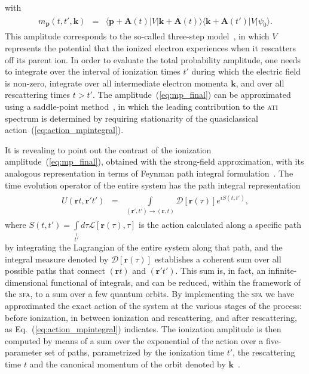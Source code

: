 %
with
%
\begin{eqnarray}
  \label{eq:mp_braketfunction}
  \begin{split}
    m_{\mathbf{p}}(t, t', \mathbf{k}) & = &
    \langle \mathbf{p} + \mathbf{A}(t) | V |
    \mathbf{k} + \mathbf{A}(t) \rangle 
    \langle \mathbf{k} + \mathbf{A}(t') | V |
    \psi_{0} \rangle.
  \end{split}
\end{eqnarray}
%
This amplitude corresponds to the so-called three-step
model~\cite{Becker_ati2002}, in which $V$ represents the potential
that the ionized electron experiences when it rescatters off its
parent ion. In order to evaluate the total probability amplitude, one
needs to integrate over the interval of ionization times $t'$ during
which the electric field is non-zero, integrate over all intermediate
electron momenta $\mathbf{k}$, and over all rescattering times $t >
t'$. The amplitude~(\ref{eq:mp_final}) can be approximated using a
saddle-point method~\cite{Lewenstein_1995}, in which the leading
contribution to the \textsc{ati} spectrum is determined by requiring
stationarity of the quasiclassical
action~(\ref{eq:action_mpintegral}).


It is revealing to point out the contrast of the ionization
amplitude~(\ref{eq:mp_final}), obtained with the strong-field
approximation, with its analogous representation in terms of Feynman
path integral formulation~\cite{RevModPhysFeynman}. The time evolution
operator of the entire system has the path integral representation
\begin{eqnarray}
\label{eq:te_path}
\begin{split}
U(\mathbf{r}t, \mathbf{r}'t') & = &
\int\limits_{(\mathbf{r}',t')\to(\mathbf{r},t)}
\mathcal{D}\left[ \mathbf{r}(\tau) \right] e^{i S(t, t')},
\end{split}
\end{eqnarray}
where $S(t, t') = \int\limits_{t'}\limits^{t} d\tau
\mathcal{L}[\mathbf{r}(\tau), \tau]$ is the action calculated along a
specific path by integrating the Lagrangian of the entire system along
that path, and the integral measure denoted by $\mathcal{D}\left[
  \mathbf{r}(\tau) \right]$ establishes a coherent sum over all
possible paths that connect $(\mathbf{r}t)$ and
$(\mathbf{r}'t')$. This sum is, in fact, an infinite-dimensional
functional of integrals, and can be reduced, within the framework of
the \textsc{sfa}, to a sum over a few quantum orbits. By
implementing the \textsc{sfa} we have approximated the
exact action of the system at the various stages of the process:
before ionization, in between ionization and rescattering, and after
rescattering, as Eq.~(\ref{eq:action_mpintegral}) indicates. The
ionization amplitude is then computed by means of a sum over the
exponential of the action over a five-parameter set of paths,
parametrized by the ionization time $t'$, the rescattering time $t$
and the canonical momentum of the orbit denoted by
$\mathbf{k}$~\cite{KopoldOptComm2000}.

